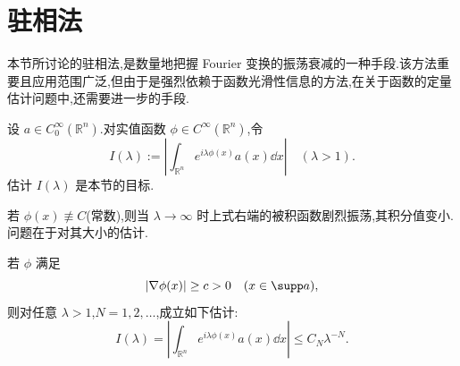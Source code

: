 \section{驻相法}\label{sec:4.4}


本节所讨论的驻相法,是数量地把握 Fourier 变换的振荡衰减的一种手段.该方法重要且应用范围广泛,但由于是强烈依赖于函数光滑性信息的方法,在关于函数的定量估计问题中,还需要进一步的手段.

设 $a \in C_{0}^{\infty}(\mathbb{R}^{n})$.对实值函数 $\phi \in C^{\infty}(\mathbb{R}^{n})$,令
\begin{equation*}
I(\lambda) := \left|\int_{\mathbb{R}^{n}}e^{i\lambda\phi(x)}a(x)\dd x\right| \quad (\lambda > 1).
\end{equation*}
估计 $I(\lambda)$ 是本节的目标.

若 $\phi(x) \not\equiv C$(常数),则当 $\lambda \to \infty$ 时上式右端的被积函数剧烈振荡,其积分值变小.问题在于对其大小的估计.

\begin{theorem}\label{thm:4.4.1}
若 $\phi$ 满足
\begin{equation*}
|\nabla\phi(x)| \geq c > 0 \quad (x \in \supp a),
\end{equation*}
则对任意 $\lambda > 1$,$N = 1, 2, \ldots$,成立如下估计:
\begin{equation}
I(\lambda) = \left|\int_{\mathbb{R}^{n}}e^{i\lambda\phi(x)}a(x)\dd x\right| \leq C_{N}\lambda^{-N}.\tag{4.4.1}
\label{eq:4.4.1}\end{equation}
\end{theorem}

